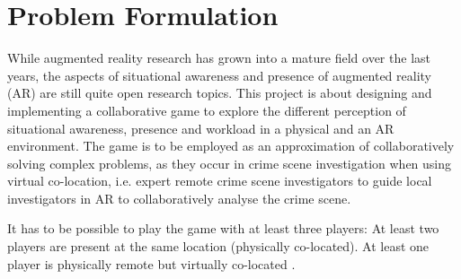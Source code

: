 \chapter{Problem Formulation} \label{cha:problem}
	While augmented reality research has grown into a mature field over the 
	last years, the aspects of situational awareness and presence of 
	augmented reality (AR) are still quite open research topics. This 
	project is about designing and implementing a collaborative game to 
	explore the different perception of situational awareness, presence and 
	workload in a physical and an AR environment. The game is to be employed 
	as an approximation of collaboratively solving complex problems, as they 
	occur in crime scene investigation when using virtual co-location, i.e. 
	expert remote crime scene investigators to guide local investigators in 
	AR to collaboratively analyse the crime scene. 
	
	It has to be possible to play the game with at least three players: At 
	least two players are present at the same location (physically 
	co-located). At least one player is physically remote but virtually 
	co-located \cite{bepsys}.
	
